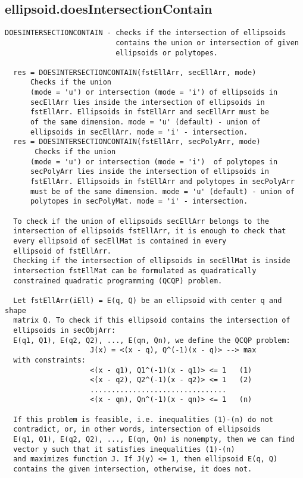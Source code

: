 \subsection{\texorpdfstring{ellipsoid.doesIntersectionContain}{doesIntersectionContain}}\label{method:ellipsoid.doesIntersectionContain}
\begin{verbatim}
DOESINTERSECTIONCONTAIN - checks if the intersection of ellipsoids
                          contains the union or intersection of given
                          ellipsoids or polytopes.

  res = DOESINTERSECTIONCONTAIN(fstEllArr, secEllArr, mode)
      Checks if the union
      (mode = 'u') or intersection (mode = 'i') of ellipsoids in
      secEllArr lies inside the intersection of ellipsoids in
      fstEllArr. Ellipsoids in fstEllArr and secEllArr must be
      of the same dimension. mode = 'u' (default) - union of
      ellipsoids in secEllArr. mode = 'i' - intersection.
  res = DOESINTERSECTIONCONTAIN(fstEllArr, secPolyArr, mode)
       Checks if the union
      (mode = 'u') or intersection (mode = 'i')  of polytopes in
      secPolyArr lies inside the intersection of ellipsoids in
      fstEllArr. Ellipsoids in fstEllArr and polytopes in secPolyArr
      must be of the same dimension. mode = 'u' (default) - union of
      polytopes in secPolyMat. mode = 'i' - intersection.

  To check if the union of ellipsoids secEllArr belongs to the
  intersection of ellipsoids fstEllArr, it is enough to check that
  every ellipsoid of secEllMat is contained in every
  ellipsoid of fstEllArr.
  Checking if the intersection of ellipsoids in secEllMat is inside
  intersection fstEllMat can be formulated as quadratically
  constrained quadratic programming (QCQP) problem.

  Let fstEllArr(iEll) = E(q, Q) be an ellipsoid with center q and shape
  matrix Q. To check if this ellipsoid contains the intersection of
  ellipsoids in secObjArr:
  E(q1, Q1), E(q2, Q2), ..., E(qn, Qn), we define the QCQP problem:
                    J(x) = <(x - q), Q^(-1)(x - q)> --> max
  with constraints:
                    <(x - q1), Q1^(-1)(x - q1)> <= 1   (1)
                    <(x - q2), Q2^(-1)(x - q2)> <= 1   (2)
                    ................................
                    <(x - qn), Qn^(-1)(x - qn)> <= 1   (n)

  If this problem is feasible, i.e. inequalities (1)-(n) do not
  contradict, or, in other words, intersection of ellipsoids
  E(q1, Q1), E(q2, Q2), ..., E(qn, Qn) is nonempty, then we can find
  vector y such that it satisfies inequalities (1)-(n)
  and maximizes function J. If J(y) <= 1, then ellipsoid E(q, Q)
  contains the given intersection, otherwise, it does not.


\end{verbatim}
